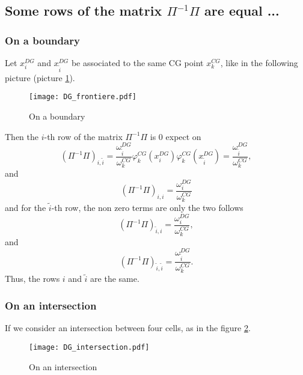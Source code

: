 \documentclass[a4paper, 11pt]{report}
\begin{document}
\subsection{Some rows of the matrix $\Pi^{-1}\Pi$ are equal ...}
\subsubsection{On a boundary}

Let $x_i^{DG}$ and $x_{\tilde{i}}^{DG}$ be associated to the same CG point $x_{k}^{CG}$, like in the following picture (picture \ref{DG_frontiere}).
\begin{figure}[H!]
\begin{center}
\texttt{[image: DG\_frontiere.pdf]}
\caption{On a boundary}
\label{DG_frontiere}
\end{center}
\end{figure}

Then the $i$-th row of the matrix $\Pi^{-1}\Pi$ is 0 expect on
\begin{equation*}
\left(\Pi^{-1}\Pi\right)_{i,\tilde{i}}=\frac{\omega_{\tilde{i}}^{DG}}{\omega_k^{CG}}\varphi_k^{CG}(x_i^{DG})\varphi_k^{CG}(x_{\tilde{i}}^{DG})=\frac{\omega_{\tilde{i}}^{DG}}{\omega_k^{CG}},
\end{equation*}
and 
\begin{equation*}
\left(\Pi^{-1}\Pi\right)_{i,i}=\frac{\omega^{DG}_i}{\omega_k^{CG}}
\end{equation*}
and for the $\tilde{i}$-th row, the non zero terms are only the two follows
\begin{equation*}
\left(\Pi^{-1}\Pi\right)_{\tilde{i},i}=\frac{\omega_{i}^{DG}}{\omega_k^{CG}},
\end{equation*}
and 
\begin{equation*}
\left(\Pi^{-1}\Pi\right)_{\tilde{i},\tilde{i}}=\frac{\omega_{\tilde{i}}^{DG}}{\omega_k^{CG}}.
\end{equation*}
Thus, the rows $i$ and $\tilde{i}$ are the same.

\subsubsection{On an intersection}
If we consider an intersection between four cells, as in the figure \ref{DG_intersection}.
\begin{figure}[H!]
\begin{center}
\texttt{[image: DG\_intersection.pdf]}
\caption{On an intersection}
\label{DG_intersection}
\end{center}
\end{figure}
\end{document}
